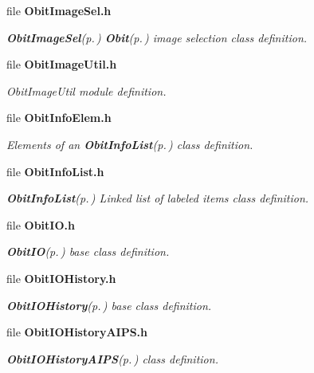 \begin{CompactItemize}
\item 
file {\bf Obit\-Image\-Sel.h}
\begin{CompactList}\small\item\em {\bf Obit\-Image\-Sel}{\rm (p.\,\pageref{structObitImageSel})} {\bf Obit}{\rm (p.\,\pageref{structObit})} image selection class definition. \item\end{CompactList}

\item 
file {\bf Obit\-Image\-Util.h}
\begin{CompactList}\small\item\em Obit\-Image\-Util module definition. \item\end{CompactList}

\item 
file {\bf Obit\-Info\-Elem.h}
\begin{CompactList}\small\item\em Elements of an {\bf Obit\-Info\-List}{\rm (p.\,\pageref{structObitInfoList})} class definition. \item\end{CompactList}

\item 
file {\bf Obit\-Info\-List.h}
\begin{CompactList}\small\item\em {\bf Obit\-Info\-List}{\rm (p.\,\pageref{structObitInfoList})} Linked list of labeled items class definition. \item\end{CompactList}

\item 
file {\bf Obit\-IO.h}
\begin{CompactList}\small\item\em {\bf Obit\-IO}{\rm (p.\,\pageref{structObitIO})} base class definition. \item\end{CompactList}

\item 
file {\bf Obit\-IOHistory.h}
\begin{CompactList}\small\item\em {\bf Obit\-IOHistory}{\rm (p.\,\pageref{structObitIOHistory})} base class definition. \item\end{CompactList}

\item 
file {\bf Obit\-IOHistory\-AIPS.h}
\begin{CompactList}\small\item\em {\bf Obit\-IOHistory\-AIPS}{\rm (p.\,\pageref{structObitIOHistoryAIPS})} class definition. \item\end{CompactList}


\end{CompactItemize}

